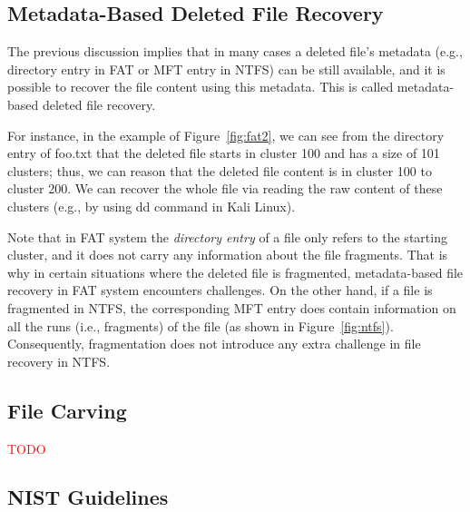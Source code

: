 \documentclass{ws-rv9x6}
\newcommand{\TODO}[1]{\textcolor{red}{#1}} %
\newenvironment{paraphrase}{\color{blue}}{\color{black}} %
\begin{document}
\subsection{Metadata-Based Deleted File Recovery}
\begin{paraphrase}
 The previous discussion implies that in many cases a deleted file's metadata 
(e.g., directory entry in FAT or MFT entry in NTFS) can be still available, 
and it is possible to recover the file content using this metadata. 
This is called metadata-based deleted file recovery.

For instance, in the example of Figure~\ref{fig:fat2},
we can see from the directory entry of foo.txt that 
the deleted file starts in cluster 100 and has a size of 101 clusters;
thus, we can reason that the deleted file content is in cluster 100 to cluster 200.
We can recover the whole file via reading the raw content of these clusters (e.g., by using dd command in Kali Linux). 

Note that in FAT system the \emph{directory entry} of a file only refers to the starting cluster, and it does not carry any information about the file fragments.
That is why in certain situations where the deleted file is fragmented, metadata-based file recovery in FAT system encounters challenges.
On the other hand, if a file is fragmented in NTFS, the corresponding MFT entry does contain information on all the runs (i.e., fragments) of the file
(as shown in Figure~\ref{fig:ntfs}). Consequently, fragmentation does not introduce any extra challenge in file recovery in NTFS.
\end{paraphrase}

\subsection{File Carving}

\TODO{TODO}

\subsection{NIST Guidelines}
\end{document}
